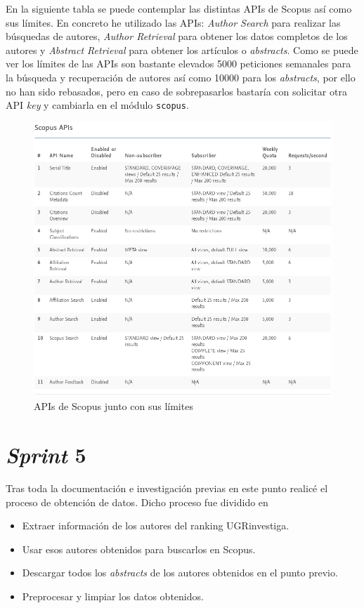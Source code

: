 En la siguiente tabla se puede contemplar las distintas \acrshort{API}s de Scopus así como sus límites. En concreto he utilizado las \acrshort{API}s: \textit{Author Search} para realizar las búsquedas de autores, \textit{Author Retrieval} para obtener los datos completos de los autores y \textit{Abstract Retrieval} para obtener los artículos o \textit{abstracts}. 
Como se puede ver los límites de las \acrshort{API}s son bastante elevados 5000 peticiones semanales para la búsqueda y recuperación de autores así como 10000 para los \textit{abstracts}, por ello no han sido rebasados, pero en caso de sobrepasarlos bastaría con solicitar otra \acrshort{API} \textit{key} y cambiarla en el módulo \texttt{scopus}.

\begin{figure}[h]
	
	\centering
	\includegraphics[width=\linewidth]{imagenes/scopusAPIs}
	\caption{ \acrshort{API}s de Scopus junto con sus límites}
\end{figure}
\section{\textit{Sprint} 5}
Tras toda la documentación e investigación previas en este punto realicé el proceso de obtención de datos. Dicho proceso fue dividido en 
\begin{itemize}
	\item Extraer información de los autores del ranking UGRinvestiga.
	\item Usar esos autores obtenidos para buscarlos en Scopus.
	\item Descargar todos los \textit{abstracts} de los autores obtenidos en el punto previo.
	\item Preprocesar y limpiar los datos obtenidos.
\end{itemize}

